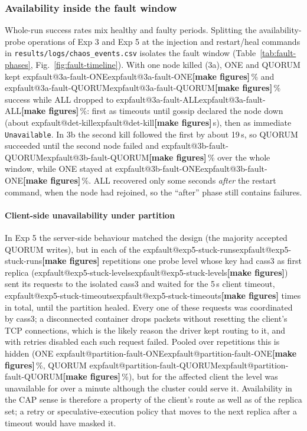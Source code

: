 \providecommand{\expfault}[1]{\ifcsname expfault@#1\endcsname\csname expfault@#1\endcsname\else\textbf{[make figures]}\fi}

\subsubsection*{Availability inside the fault window}
Whole-run success rates mix healthy and faulty periods. Splitting the availability-probe
operations of Exp 3 and Exp 5 at the injection and restart/heal commands in
\texttt{results/logs/chaos\_events.csv} isolates the fault window
(Table~\ref{tab:fault-phases}, Fig.~\ref{fig:fault-timeline}). With one node killed (3a), ONE
and QUORUM kept \expfault{3a-fault-ONE}\,\% and \expfault{3a-fault-QUORUM}\,\% success while ALL
dropped to \expfault{3a-fault-ALL}\,\%: first as timeouts until gossip declared the node down
(about \expfault{det-kill}\,s), then as immediate \texttt{Unavailable}. In 3b the second kill
followed the first by about 19\,s, so QUORUM succeeded until the second node failed and
\expfault{3b-fault-QUORUM}\,\% over the whole window, while ONE stayed at
\expfault{3b-fault-ONE}\,\%. ALL recovered only some seconds \emph{after} the restart command,
when the node had rejoined, so the ``after'' phase still contains failures.

\paragraph{Client-side unavailability under partition}
In Exp 5 the server-side behaviour matched the design (the majority accepted QUORUM writes),
but in each of the \expfault{exp5-stuck-runs} repetitions one probe level whose key had cass3
as first replica (\expfault{exp5-stuck-levels}) sent its requests to the isolated cass3 and
waited for the 5\,s client timeout, \expfault{exp5-stuck-timeouts} times in total, until the
partition healed. Every one of these requests was coordinated by cass3; a disconnected
container drops packets without resetting the client's TCP connections, which is the likely
reason the driver kept routing to it, and with retries disabled each such request failed. Pooled over repetitions
this is hidden (ONE \expfault{partition-fault-ONE}\,\%, QUORUM \expfault{partition-fault-QUORUM}\,\%),
but for the affected client the level was unavailable for over a minute although the cluster
could serve it. Availability in the CAP sense is therefore a property of the client's route as
well as of the replica set; a retry or speculative-execution policy that moves to the next
replica after a timeout would have masked it.

